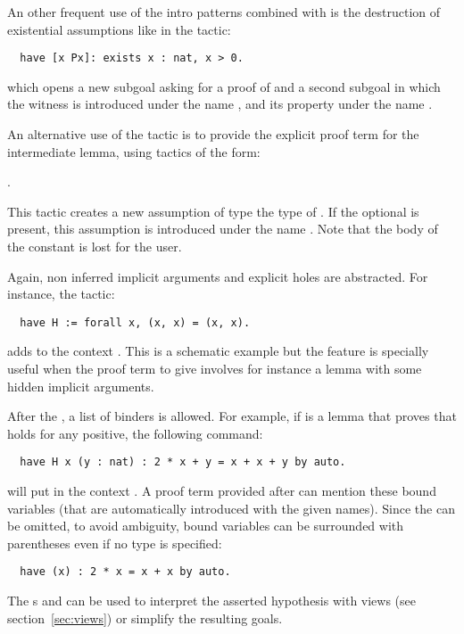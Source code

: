 An other frequent use of the intro patterns combined with  is the
destruction of existential assumptions like in the tactic:
\begin{lstlisting}
  have [x Px]: exists x : nat, x > 0.
\end{lstlisting}
which opens a new subgoal asking for a proof of  and  a second subgoal in which the witness is introduced under
the name , and its property under the name .

An alternative use of the  tactic is to provide the explicit proof
term for the intermediate lemma, using tactics of the form:

\begin{center}
    \ssrC{:=} {\term}.
\end{center}

This tactic creates a new assumption of type the type of
{\term}. If the
optional  is present, this assumption is introduced under
the name . Note that the body of the constant is lost for
the user.

Again, non inferred implicit arguments and explicit holes are abstracted. For
instance, the tactic:
\begin{lstlisting}
  have H := forall x, (x, x) = (x, x).
\end{lstlisting}
adds to the context . This is a schematic example but
the feature is specially useful when the proof term to give involves
for instance a lemma with some hidden implicit arguments.

After the , a list of binders is allowed.
For example, if  is a lemma that proves that
 holds for any positive, the following command:
\begin{lstlisting}
  have H x (y : nat) : 2 * x + y = x + x + y by auto.
\end{lstlisting}
will put in the context . A proof term
provided after \ssrC{:=} can mention these bound variables (that are
automatically introduced with the given names).
Since the  can be omitted, to avoid ambiguity, bound variables
can be surrounded with parentheses even if no type is specified:
\begin{lstlisting}
  have (x) : 2 * x = x + x by auto.
\end{lstlisting}

The s and  can be used to interpret the
asserted hypothesis with views (see section~\ref{sec:views}) or
simplify the resulting goals.

